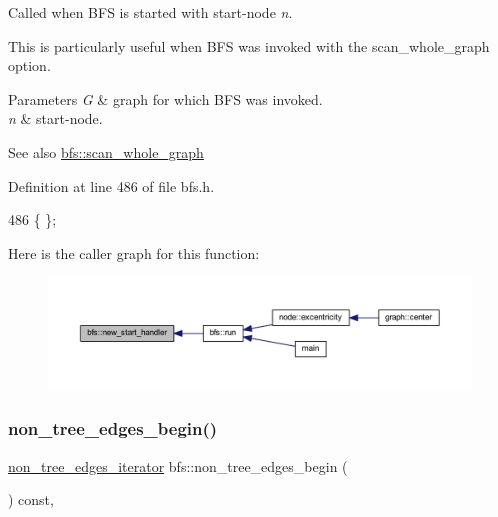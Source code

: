 Called when B\+FS is started with start-\/node {\itshape n}. 

This is particularly useful when B\+FS was invoked with the {\ttfamily scan\+\_\+whole\+\_\+graph} option.


\begin{DoxyParams}{Parameters}
{\em G} & graph for which B\+FS was invoked. \\
\hline
{\em n} & start-\/node. \\
\hline
\end{DoxyParams}
\begin{DoxySeeAlso}{See also}
\mbox{\hyperlink{classbfs_a25fc51b1bfbbdd3afefe0a84c1bd2f6b}{bfs\+::scan\+\_\+whole\+\_\+graph}} 
\end{DoxySeeAlso}


Definition at line 486 of file bfs.\+h.


\begin{DoxyCode}
486 \{ \};
\end{DoxyCode}
Here is the caller graph for this function\+:
\nopagebreak
\begin{figure}[H]
\begin{center}
\leavevmode
\includegraphics[width=350pt]{classbfs_ab89a3d1cb36b20a86837b0345063e4b1_icgraph}
\end{center}
\end{figure}
\mbox{\label{classbfs_a06d02d2643f184b4c086678771f0ff90}} 
\subsubsection{\texorpdfstring{non\+\_\+tree\+\_\+edges\+\_\+begin()}{non\_tree\_edges\_begin()}}
{\footnotesize\ttfamily \mbox{\hyperlink{classbfs_a89ec32919076618d9eef18990fef543f}{non\+\_\+tree\+\_\+edges\+\_\+iterator}} bfs\+::non\+\_\+tree\+\_\+edges\+\_\+begin (\begin{DoxyParamCaption}{ }\end{DoxyParamCaption}) const\hspace{0.3cm}{\ttfamily [inline]}, {\ttfamily [inherited]}}



